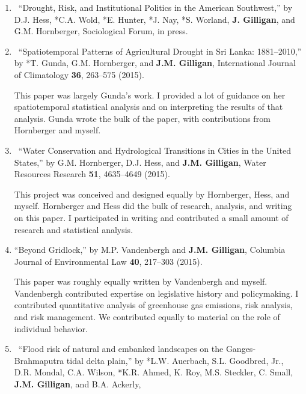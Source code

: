%
%
\begin{enumerate}
%
    \item
    \textdagger\
    \enquote{Drought, Risk, and Institutional Politics in the American Southwest,}
    by D.J. Hess, *C.A. Wold, *E. Hunter, *J. Nay, *S. Worland, \textbf{J. Gilligan}, and G.M. Hornberger,
    Sociological Forum, in press.
%    
    \item 
	\textdagger\
	 \enquote{Spatiotemporal Patterns of Agricultural Drought in Sri Lanka: 1881--2010,}
	    by *T. Gunda, G.M. Hornberger, and \textbf{J.M. Gilligan}, 
	    International Journal of Climatology \textbf{36}, 263--575 (2015).
        \begin{credit}
        This paper was largely Gunda's work. I provided a lot of guidance on her spatiotemporal statistical analysis and on interpreting the results of that analysis. Gunda wrote the bulk of the paper, with contributions from Hornberger and myself.
        \end{credit}
%
    \item 
	\textdagger\ 
	\enquote{Water Conservation and Hydrological Transitions in Cities in the United States,}
	    by G.M. Hornberger, D.J. Hess, and \textbf{J.M. Gilligan}, 
	    Water Resources Research \textbf{51}, 4635--4649 (2015).
	    \begin{credit}
	    This project was conceived and designed equally by Hornberger, Hess, and myself. Hornberger and Hess did the bulk of research, analysis, and writing on this paper. I participated in writing and contributed a small amount of research and statistical analysis.
	    \end{credit}
%
    \item 
	\enquote{Beyond Gridlock,}
	    by M.P. Vandenbergh and \textbf{J.M. Gilligan}, 
	    Columbia Journal of Environmental Law
        \textbf{40}, 217--303 (2015).
        \begin{credit}
        This paper was roughly equally written by Vandenbergh and myself. Vandenbergh contributed expertise on legislative history and policymaking. I contributed quantitative analysis of greenhouse gas emissions, risk analysis, and risk management. We contributed equally to material on the role of individual behavior.
        \end{credit}
%
    \item 
	\textdagger\ 
	\enquote{Flood risk of natural and embanked landscapes on the Ganges-Brahmaputra tidal delta plain,}
	    by *L.W. Auerbach, S.L. Goodbred, Jr., D.R. Mondal, C.A. Wilson, *K.R. Ahmed, K. Roy, M.S. Steckler, C. Small, \textbf{J.M. Gilligan}, and B.A. Ackerly,

\end{enumerate}
